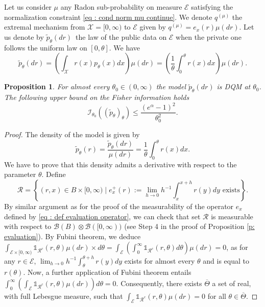 \documentclass[a4paper, 11pt]{article}
\newtheorem{prop}{Proposition}
\theoremstyle{definition}
\newcommand{\cB}{{\mathcal{B}}}
\newcommand{\cE}{{\mathcal{E}}}
\newcommand{\cI}{{\mathcal{I}}}
\newcommand{\cR}{{\mathcal{R}}}
\newcommand{\cX}{{\mathcal{X}}}
\newcommand{\indi}[1]{\mathds{1}_{#1}}
\begin{document}
{Let us consider $\mu$ any Radon sub-probability on  measure $\cE$ satisfying the normalization constraint \eqref{eq : cond norm mu continue}. We denote $q^{(\mu)}$ the extremal mechanism from $\cX=[0,\infty)$ to $\cE$ given by $q^{(\mu)}=e_x(r) \mu(dr)$. Let us denote by $\tilde{p}_\theta(dr)$ the law of the public data on $\cE$ when the private one follows the uniform law on $[0,\theta]$. We have
\begin{equation*}
	\tilde{p}_\theta(dr)=\left(\int_\cX r(x)p_\theta(x)dx\right) \mu(dr)=
	\left(\frac{1}{\theta}\int_0^\theta r(x)dx \right)\mu(dr).
\end{equation*}
\begin{prop}\label{prop : Fisher unif}
	 For almost every $\theta_0 \in (0,\infty)$ the model
	$\tilde{p}_\theta(dr)$ is DQM at $\theta_0$. The following upper bound on the Fisher information holds
	\begin{equation*}
		\cI_{\theta_0}\left((\widetilde{p}_\theta)_\theta\right) \le \frac{(e^\alpha-1)^2}{\theta_0^2}.
	\end{equation*}
\end{prop}
\begin{proof}
	The density of the model is given by 
	\begin{equation}
		\label{eq : tilde p unif}
		\tilde{p}_\theta(r) =\frac{\tilde{p}_\theta(dr)}{\mu(dr)}=\frac{1}{\theta} \int_0^\theta r(x)dx.
	\end{equation}
		 We have to prove that this density admits a derivative with respect to the parameter $\theta$. Define 
	\begin{equation*}
		\cR=\left\{(r,x)\in B \times [0,\infty) \mid e_x^+(r):=\lim_{h\to0} h^{-1}\int_x^{x+h} r(y) dy \text{ exists} \right\}.
	\end{equation*}
	By similar argument as for the proof of the measurability of the operator $e_x$ defined by \eqref{eq : def evaluation operator}, we can check that set $\cR$ is measurable with respect to $\cB(B)\otimes\cB([0,\infty))$ (see Step 4 in the proof of Proposition \ref{p: evaluation}). By Fubini theorem, we deduce
	$\int_{\cE \times [0,\infty)} \indi{\cR^c}(r,\theta) \mu(dr)\times d\theta=
\int_{\cE} \left(\int_0^\infty \indi{\cR^c}(r,\theta) d\theta \right)\mu(dr)=0$, as for any $r\in \cE$, $\lim_{h\to0} h^{-1}\int_\theta^{\theta+h} r(y) dy$ exists for almost every $\theta$ and is equal to $r(\theta)$. Now, a further application of Fubini theorem entails  
$ \int_0^\infty\left(\int_{\cE} \indi{\cR^c}(r,\theta) \mu(dr) \right)d\theta=0$.
 Consequently, there exists $\overline{\Theta}$ a set of real, with full Lebesgue
  measure, such that $\int_{\cE} \indi{\cR^c}(r,\theta) \mu(dr)=0$ for all $\theta \in \overline{\Theta}$.


\end{proof}}
\end{document}
